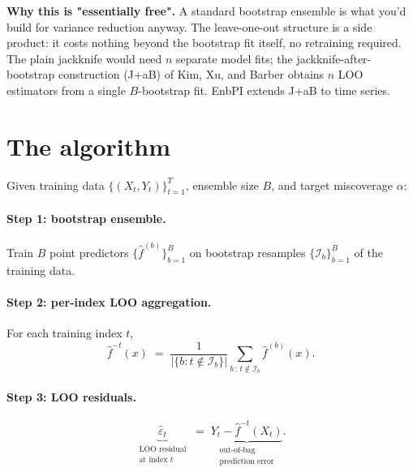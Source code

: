 \documentclass[letterpaper,11pt,leqno]{article}
\begin{document}
\begin{algorithmexplain}
\textbf{Why this is "essentially free".} A standard bootstrap ensemble is what you'd build for variance reduction anyway. The leave-one-out structure is a side product: it costs nothing beyond the bootstrap fit itself, no retraining required. The plain jackknife would need $n$ separate model fits; the jackknife-after-bootstrap construction (J+aB) of Kim, Xu, and Barber \cite{kim2020jpb} obtains $n$ LOO estimators from a single $B$-bootstrap fit. EnbPI extends J+aB to time series.
\end{algorithmexplain}

\section{The algorithm}\label{s:algorithm}

Given training data $\{(X_t, Y_t)\}_{t=1}^T$, ensemble size $B$, and target miscoverage $\alpha$:

\paragraph{Step 1: bootstrap ensemble.} Train $B$ point predictors $\{\hat{f}^{(b)}\}_{b=1}^B$ on bootstrap resamples $\{\mathcal{I}_b\}_{b=1}^B$ of the training data.

\paragraph{Step 2: per-index LOO aggregation.} For each training index $t$,
\begin{equation*}
\hat{f}^{-t}(x)
\;=\;
\frac{1}{|\{b : t \notin \mathcal{I}_b\}|}
\sum_{b\,:\,t \notin \mathcal{I}_b}
\hat{f}^{(b)}(x).
\end{equation*}

\paragraph{Step 3: LOO residuals.}
\begin{equation*}
\underbrace{\hat{\varepsilon}_t}_{\substack{\text{LOO residual}\\\text{at index } t}}
\;=\;
\underbrace{Y_t - \hat{f}^{-t}(X_t)}_{\substack{\text{out-of-bag}\\\text{prediction error}}}.
\end{equation*}
\end{document}
